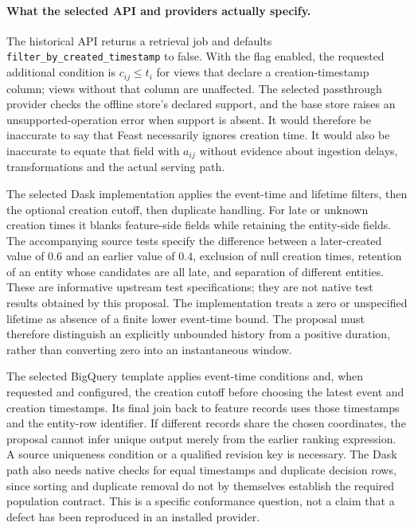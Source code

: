 \paragraph{What the selected API and providers actually specify.}
The historical API returns a retrieval job and defaults
\texttt{filter\_by\_created\_timestamp} to false. With the flag enabled,
the requested additional condition is $c_{ij}\leq t_i$ for views that declare
a creation-timestamp column; views without that column are unaffected. The
selected passthrough provider checks the offline store's declared support,
and the base store raises an unsupported-operation error when support is
absent. It would therefore be inaccurate to say that Feast necessarily
ignores creation time. It would also be inaccurate to equate that field with
$a_{ij}$ without evidence about ingestion delays, transformations and the
actual serving path.~\citep{exec19_feast_source}

The selected Dask implementation applies the event-time and lifetime filters,
then the optional creation cutoff, then duplicate handling. For late or
unknown creation times it blanks feature-side fields while retaining the
entity-side fields. The accompanying source tests specify the difference
between a later-created value of $0.6$ and an earlier value of $0.4$, exclusion
of null creation times, retention of an entity whose candidates are all late,
and separation of different entities. These are informative upstream test
specifications; they are not native test results obtained by this proposal.
The implementation treats a zero or unspecified lifetime as absence of a
finite lower event-time bound. The proposal must therefore distinguish an
explicitly unbounded history from a positive duration, rather than converting
zero into an instantaneous window.~\citep{exec19_feast_source}

The selected BigQuery template applies event-time conditions and, when
requested and configured, the creation cutoff before choosing the latest
event and creation timestamps. Its final join back to feature records uses
those timestamps and the entity-row identifier. If different records share
the chosen coordinates, the proposal cannot infer unique output merely from
the earlier ranking expression. A source uniqueness condition or a qualified
revision key is necessary. The Dask path also needs native checks for equal
timestamps and duplicate decision rows, since sorting and duplicate removal
do not by themselves establish the required population contract. This is a
specific conformance question, not a claim that a defect has been reproduced
in an installed provider.~\citep{exec19_feast_source}

